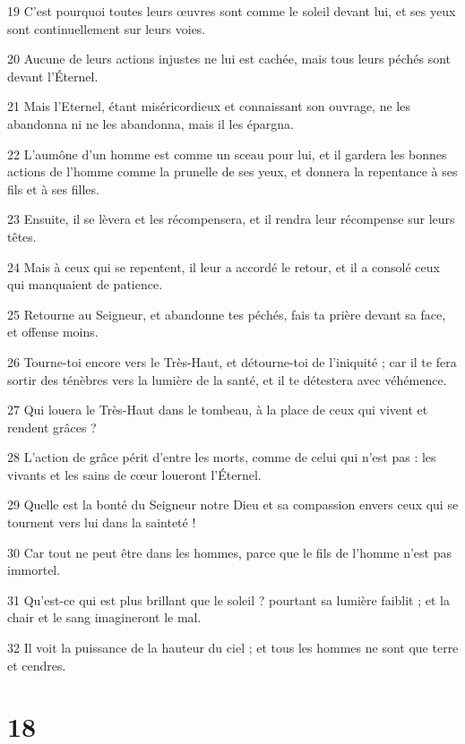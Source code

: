 \par 19 C'est pourquoi toutes leurs œuvres sont comme le soleil devant lui, et ses yeux sont continuellement sur leurs voies.
\par 20 Aucune de leurs actions injustes ne lui est cachée, mais tous leurs péchés sont devant l'Éternel.
\par 21 Mais l'Eternel, étant miséricordieux et connaissant son ouvrage, ne les abandonna ni ne les abandonna, mais il les épargna.
\par 22 L'aumône d'un homme est comme un sceau pour lui, et il gardera les bonnes actions de l'homme comme la prunelle de ses yeux, et donnera la repentance à ses fils et à ses filles.
\par 23 Ensuite, il se lèvera et les récompensera, et il rendra leur récompense sur leurs têtes.
\par 24 Mais à ceux qui se repentent, il leur a accordé le retour, et il a consolé ceux qui manquaient de patience.
\par 25 Retourne au Seigneur, et abandonne tes péchés, fais ta prière devant sa face, et offense moins.
\par 26 Tourne-toi encore vers le Très-Haut, et détourne-toi de l'iniquité ; car il te fera sortir des ténèbres vers la lumière de la santé, et il te détestera avec véhémence.
\par 27 Qui louera le Très-Haut dans le tombeau, à la place de ceux qui vivent et rendent grâces ?
\par 28 L'action de grâce périt d'entre les morts, comme de celui qui n'est pas : les vivants et les sains de cœur loueront l'Éternel.
\par 29 Quelle est la bonté du Seigneur notre Dieu et sa compassion envers ceux qui se tournent vers lui dans la sainteté !
\par 30 Car tout ne peut être dans les hommes, parce que le fils de l'homme n'est pas immortel.
\par 31 Qu'est-ce qui est plus brillant que le soleil ? pourtant sa lumière faiblit ; et la chair et le sang imagineront le mal.
\par 32 Il voit la puissance de la hauteur du ciel ; et tous les hommes ne sont que terre et cendres.

\chapter{18}

